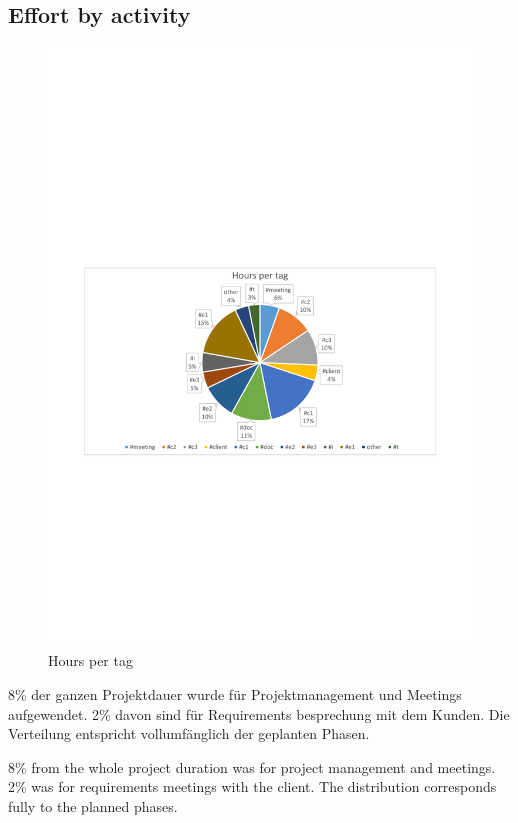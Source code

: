 \subsection{Effort by activity}
\begin{figure}[]
	\includegraphics[trim=4cm 9.6cm 3.5cm 11.1cm, clip=true, width=\textwidth]{img/project_monitoring_hours_per_tag_diagram.pdf}
	\caption{Hours per tag}
	\label{fig:hours:per:tag}
\end{figure}

8\% der ganzen Projektdauer wurde für Projektmanagement
und Meetings aufgewendet. 2\% davon sind für Requirements besprechung mit dem Kunden. Die Verteilung
entspricht vollumfänglich der geplanten Phasen. 

8\% from the whole project duration was for project management and meetings. 2\% was for requirements meetings with the client.
The distribution corresponds fully to the planned phases.
